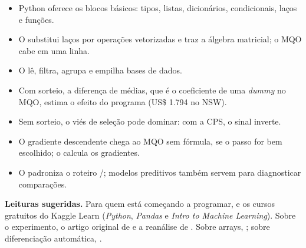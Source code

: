 \begin{itemize}[nosep]
  \item Python oferece os blocos básicos: tipos, listas, dicionários,
        condicionais, laços e funções.
  \item O  substitui laços por operações vetorizadas e traz a álgebra
        matricial; o MQO cabe em uma linha.
  \item O  lê, filtra, agrupa e empilha bases de dados.
  \item Com sorteio, a diferença de médias, que é o coeficiente de uma
        \emph{dummy} no MQO, estima o efeito do programa (US\$ 1.794 no NSW).
  \item Sem sorteio, o viés de seleção pode dominar: com a CPS, o sinal inverte.
  \item O gradiente descendente chega ao MQO sem fórmula, se o passo for bem
        escolhido; o  calcula os gradientes.
  \item O  padroniza o roteiro /; modelos
        preditivos também servem para diagnosticar comparações.
\end{itemize}

\noindent\textbf{Leituras sugeridas.} Para quem está começando a programar,
\textcite[caps.~1--10]{downey2016} e os cursos gratuitos do Kaggle Learn
(\emph{Python}, \emph{Pandas} e \emph{Intro to Machine Learning}). Sobre o
experimento, o artigo original de \textcite{lalonde1986} e a reanálise de
\textcite{dehejia1999}. Sobre arrays, \textcite{harris2020}; sobre
diferenciação automática, \textcite{baydin2018}.
